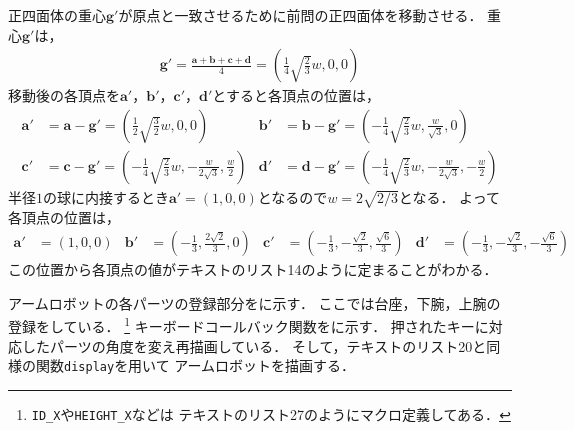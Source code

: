 正四面体の重心$\bm{g}'$が原点と一致させるために前問の正四面体を移動させる．
重心$\bm{g}'$は，
\begin{align*}
	\bm{g}' = \frac{\bm{a} + \bm{b} + \bm{c} + \bm{d}}{4}
	= \left(\frac{1}{4}\sqrt{\frac{2}{3}}w, 0, 0\right)
\end{align*}
移動後の各頂点を$\bm{a}'$，$\bm{b}'$，$\bm{c}'$，$\bm{d}'$とすると各頂点の位置は，
\begin{align*}
	\bm{a}' &= \bm{a} - \bm{g}'
	= \left(\frac{1}{2}\sqrt{\frac{3}{2}}w, 0, 0\right) &
	\bm{b}' &= \bm{b} - \bm{g}'
	= \left(-\frac{1}{4}\sqrt{\frac{2}{3}}w, \frac{w}{\sqrt{3}}, 0\right)\\
	\bm{c}' &= \bm{c} - \bm{g}'
	= \left(-\frac{1}{4}\sqrt{\frac{2}{3}}w, -\frac{w}{2\sqrt{3}}, \frac{w}{2}\right) &
	\bm{d}' &= \bm{d} - \bm{g}'
	= \left(-\frac{1}{4}\sqrt{\frac{2}{3}}w, -\frac{w}{2\sqrt{3}}, -\frac{w}{2}\right)
\end{align*}
半径$1$の球に内接するとき$\bm{a}'=(1,0,0)$となるので$w=2\sqrt{2/3}$となる．
よって各頂点の位置は，
\begin{align*}
	\bm{a}' &= \left(1, 0, 0\right) &
	\bm{b}' &= \left(-\frac{1}{3}, \frac{2\sqrt{2}}{3}, 0\right) &
	\bm{c}' &= \left(-\frac{1}{3}, -\frac{\sqrt{2}}{3}, \frac{\sqrt{6}}{3}\right) &
	\bm{d}' &= \left(-\frac{1}{3}, -\frac{\sqrt{2}}{3}, -\frac{\sqrt{6}}{3}\right)
\end{align*}
この位置から各頂点の値がテキストのリスト14のように定まることがわかる．




アームロボットの各パーツの登録部分をに示す．
ここでは台座，下腕，上腕の登録をしている．
\footnote{
	\texttt{ID\_X}や\texttt{HEIGHT\_X}などは
	テキストのリスト27のようにマクロ定義してある．
}
キーボードコールバック関数をに示す．
押されたキーに対応したパーツの角度を変え再描画している．
そして，テキストのリスト20と同様の関数\texttt{display}を用いて
アームロボットを描画する．





